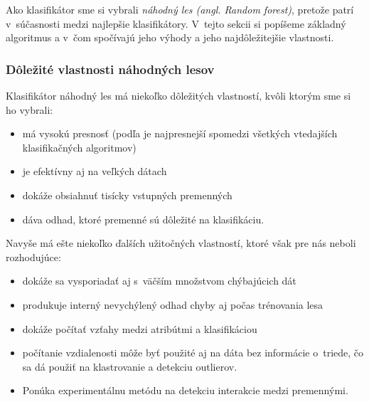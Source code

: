 

Ako klasifikátor sme si vybrali \textit{náhodný les (angl. Random forest)}, pretože patrí v~súčasnosti medzi najlepšie klasifikátory. V~tejto sekcii si popíšeme základný algoritmus a v~čom spočívajú jeho výhody a jeho najdôležitejšie vlastnosti.

\subsubsection[Dôležité vlastnosti]{Dôležité vlastnosti náhodných lesov}
Klasifikátor náhodný les má niekoľko dôležitých vlastností, kvôli ktorým sme si ho vybrali:
\begin{itemize}
\item má vysokú presnosť (podľa \cite{randomForest} je najpresnejší spomedzi všetkých vtedajších klasifikačných algoritmov)
\item je efektívny aj na veľkých dátach
\item dokáže obsiahnuť tisícky vstupných premenných
\item dáva odhad, ktoré premenné sú dôležité na klasifikáciu.
\end{itemize}
\cite{randomForest}

Navyše má ešte niekoľko ďalších užitočných vlastností, ktoré však pre nás neboli rozhodujúce:

\begin{itemize}
\item dokáže sa vysporiadať aj s~väčším množstvom chýbajúcich dát
\item produkuje interný nevychýlený odhad chyby aj počas trénovania lesa
\item dokáže počítať vzťahy medzi atribútmi a klasifikáciou
\item počítanie vzdialenosti môže byť použité aj na dáta bez informácie o~triede, čo sa dá použiť na klastrovanie a detekciu outlierov.
\item Ponúka experimentálnu metódu na detekciu interakcie medzi premennými.
\end{itemize}
\cite{randomForest}

